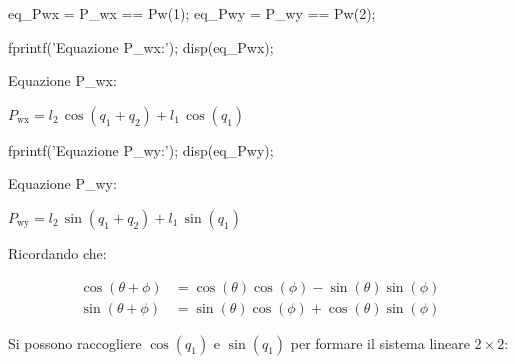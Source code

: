 \documentclass[11pt, a4paper]{article}
\begin{document}
\begin{matlabcode}
eq_Pwx = P_wx == Pw(1);
eq_Pwy = P_wy == Pw(2);

fprintf('Equazione P_wx:\n');
disp(eq_Pwx);
\end{matlabcode}
\begin{matlaboutput}
Equazione P_wx:
\end{matlaboutput}
\begin{matlabsymbolicoutput}
$\displaystyle P_{\textrm{wx}} =l_2 \,\cos \left(q_1 +q_2 \right)+l_1 \,\cos \left(q_1 \right)$
\end{matlabsymbolicoutput}
\begin{matlabcode}
fprintf('Equazione P_wy:\n');
disp(eq_Pwy);
\end{matlabcode}
\begin{matlaboutput}
Equazione P_wy:
\end{matlaboutput}
\begin{matlabsymbolicoutput}
$\displaystyle P_{\textrm{wy}} =l_2 \,\sin \left(q_1 +q_2 \right)+l_1 \,\sin \left(q_1 \right)$
\end{matlabsymbolicoutput}

\begin{par}
\begin{flushleft}
Ricordando che:
\end{flushleft}
\end{par}

\[
\begin{aligned}
    \cos(\theta + \phi) &= \cos(\theta)\cos(\phi) - \sin(\theta)\sin(\phi) \\
    \sin(\theta + \phi) &= \sin(\theta)\cos(\phi) + \cos(\theta)\sin(\phi)
\end{aligned}
\]

\begin{par}
\begin{flushleft}
Si possono raccogliere $\cos (q_1 )$ e $\sin (q_1 )$ per formare il sistema lineare $2 \times 2$:
\end{flushleft}
\end{par}
\end{document}
